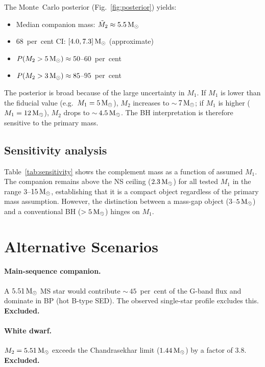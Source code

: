 \documentclass[usenatbib,fleqn]{mnras}
\newcommand{\Msun}{{\rm M}_\odot}
\begin{document}
The Monte~Carlo posterior (Fig.~\ref{fig:posterior}) yields:
\begin{itemize}
\item Median companion mass: $\tilde{M}_2 \approx 5.5\,\Msun$
\item 68~per~cent CI: $[4.0, 7.3]\,\Msun$ (approximate)
\item $P(M_2 > 5\,\Msun) \approx 50$--$60$~per~cent
\item $P(M_2 > 3\,\Msun) \approx 85$--$95$~per~cent
\end{itemize}

The posterior is broad because of the large uncertainty in $M_1$.
If $M_1$ is lower than the fiducial value (e.g.\ $M_1 = 5\,\Msun$),
$M_2$ increases to $\sim$\,$7\,\Msun$; if $M_1$ is higher
($M_1 = 12\,\Msun$), $M_2$ drops to $\sim$\,$4.5\,\Msun$.  The
BH interpretation is therefore sensitive to the primary mass.

\subsection{Sensitivity analysis}
\label{sec:results:sensitivity}

Table~\ref{tab:sensitivity} shows the complement mass as a function
of assumed $M_1$.  The companion remains above the NS ceiling
($2.3\,\Msun$) for all tested $M_1$ in the range
$3$--$15\,\Msun$, establishing that it is a compact object
regardless of the primary mass assumption.  However, the
distinction between a mass-gap object ($3$--$5\,\Msun$) and a
conventional BH ($> 5\,\Msun$) hinges on $M_1$.

\section{Alternative Scenarios}
\label{sec:alternatives}

\paragraph{Main-sequence companion.}
A $5.51\,\Msun$ MS star would contribute $\sim$\,$45$~per~cent of
the G-band flux and dominate in BP (hot B-type SED).  The observed
single-star profile excludes this.  \textbf{Excluded.}

\paragraph{White dwarf.}
$M_2 = 5.51\,\Msun$ exceeds the Chandrasekhar limit
($1.44\,\Msun$) by a factor of 3.8.  \textbf{Excluded.}
\end{document}
